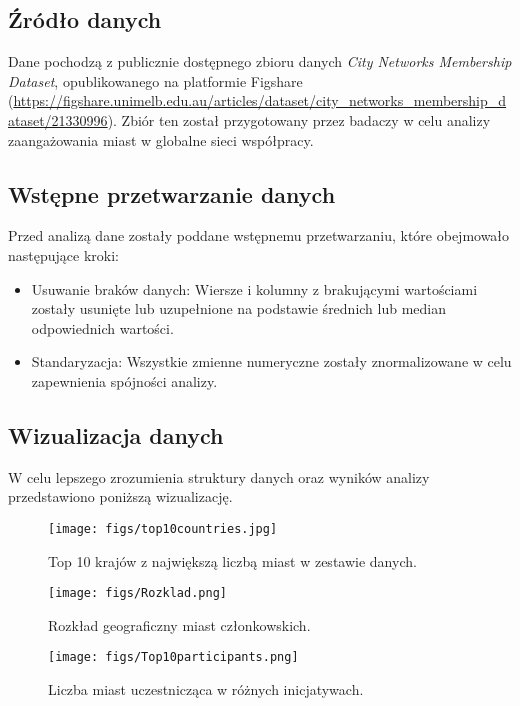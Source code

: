 \documentclass[a4paper,fleqn]{cas-dc}
\begin{document}
\subsection{Źródło danych}
Dane pochodzą z publicznie dostępnego zbioru danych \textit{City Networks Membership Dataset}, opublikowanego na platformie Figshare (\url{https://figshare.unimelb.edu.au/articles/dataset/city_networks_membership_dataset/21330996}). Zbiór ten został przygotowany przez badaczy w celu analizy zaangażowania miast w globalne sieci współpracy.

\subsection{Wstępne przetwarzanie danych}
Przed analizą dane zostały poddane wstępnemu przetwarzaniu, które obejmowało następujące kroki:
\begin{itemize}
    \item{Usuwanie braków danych:} Wiersze i kolumny z brakującymi wartościami zostały usunięte lub uzupełnione na podstawie średnich lub median odpowiednich wartości.
    \item{Standaryzacja:} Wszystkie zmienne numeryczne zostały znormalizowane w celu zapewnienia spójności analizy.   
\end{itemize}

\newpage
\subsection{Wizualizacja danych}

W celu lepszego zrozumienia struktury danych oraz wyników analizy przedstawiono poniższą wizualizację.

\begin{figure}[!htb]
    \centering
    \texttt{[image: figs/top10countries.jpg]}
    \caption{Top 10 krajów z największą liczbą miast w zestawie danych.}
    \label{FIG:top10countries}
\end{figure}

\begin{figure}[!htb]
    \centering
    \texttt{[image: figs/Rozklad.png]}
    \caption{Rozkład geograficzny miast członkowskich.}
    \label{FIG:geographical_distribution}
\end{figure}

\begin{figure}[!htb]
    \centering
    \texttt{[image: figs/Top10participants.png]}
    \caption{Liczba miast uczestnicząca w różnych inicjatywach.}
    \label{FIG:initiatives_participation}
\end{figure}
\end{document}
